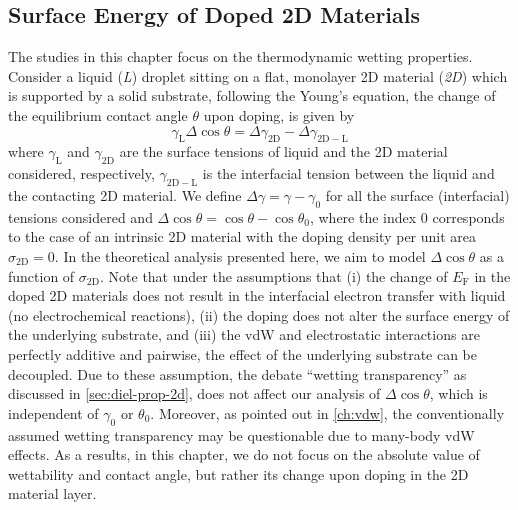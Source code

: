 \subsection{Surface Energy of Doped 2D Materials}
\label{sec:wet-gamma-doped}

The studies in this chapter focus on the thermodynamic wetting
properties.
%
Consider a liquid (\emph{L}) droplet sitting on a flat,
monolayer 2D material (\emph{2D}) which is supported by a solid substrate,
following the Young’s equation, the change of the equilibrium contact
angle \(\theta\) upon doping, is given by
\begin{equation}
\label{eqn:wet-def-Young-Delta-theta}
\gamma_{\mathrm{L}} \Delta \cos\theta = \Delta \gamma_{\mathrm{2D}}
                                 - \Delta \gamma_{\mathrm{2D-L}}
\end{equation}
where \(\gamma_{\mathrm{L}}\) and \(\gamma_{\mathrm{2D}}\) are the
surface tensions of liquid and the 2D material considered,
respectively, \(\gamma_{\mathrm{2D-L}}\) is the interfacial tension
between the liquid and the contacting 2D material. We define
\(\Delta \gamma = \gamma - \gamma_{0}\) for all the surface
(interfacial) tensions considered and
\(\Delta \cos \theta = \cos \theta - \cos \theta_{0}\), where the
index 0 corresponds to the case of an intrinsic 2D material with the
doping density per unit area \(\sigma_{\mathrm{2D}} = 0\).
%
In the
theoretical analysis presented here, we aim to model
\(\Delta \cos \theta\) as a function of \(\sigma_{\mathrm{2D}}\). Note
that under the assumptions that (i) the change of \(E_{\mathrm{F}}\)
in the doped 2D materials does not result in the interfacial electron
transfer with liquid (\ie no electro\-chemical reactions), (ii) the doping
does not alter the surface energy of the underlying substrate,
and (iii) the vdW and electrostatic interactions are perfectly
additive and pairwise, the effect of the underlying
substrate can be decoupled.
%
Due to these assumption, the debate “wetting transparency”
\cite{rafiee_2012_transparency,shih_2013_wetting_natmat} as discussed in \autoref{sec:diel-prop-2d}, does not
affect our analysis of \(\Delta \cos \theta\), which is independent of
\(\gamma_{0}\) or \(\theta_{0}\).
%
Moreover, as pointed out in \autoref{ch:vdw}, the conventionally
assumed wetting transparency may be questionable due to many-body vdW
effects. As a results, in this chapter, we do not focus on the
absolute value of wettability and contact angle, but rather its change
upon doping in the 2D material layer.

